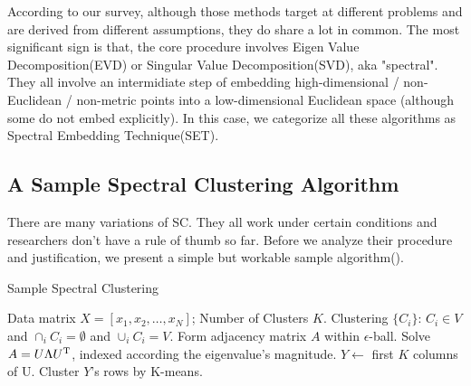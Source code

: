 
According to our survey, although those methods target at different problems
and are derived from different assumptions, they do share a lot in common. 
The most significant sign is that, the core procedure involves 
Eigen Value Decomposition(EVD) or Singular Value Decomposition(SVD), aka "spectral". 
They all involve an intermidiate step of embedding high-dimensional / 
non-Euclidean / non-metric points into a low-dimensional Euclidean space
(although some do not embed explicitly). In this case, we categorize all 
these algorithms as Spectral Embedding Technique(SET). 


\subsection{A Sample Spectral Clustering Algorithm}


There are many variations of SC. They all work under certain conditions
and researchers don't have a rule of thumb so far. Before we analyze their
procedure and justification, we present a simple but workable sample 
algorithm(\ralg{\ref{alg:sc_sample}}). 

\begin{algorithm}[htb]
	\caption{Sample Spectral Clustering}
	\label{alg:sc_sample}
	\begin{algorithmic}[1]
		\REQUIRE Data matrix $X = [x_1, x_2, \ldots, x_N]$;  
		Number of Clusters $K$. 
		\ENSURE Clustering $\{C_i\}$: $C_i \in V$ 
			and $\cap_i C_i = \emptyset$
			and $\cup_i C_i = V$. 
		\STATE Form adjacency matrix $A$ within $\epsilon$-ball.
		\STATE Solve $A = U \Lambda U^\mathrm{T}$, indexed according 
		the eigenvalue's magnitude. 
		\STATE $Y \leftarrow$ first $K$ columns of U. 
		\STATE Cluster $Y$'s rows by K-means. 
	\end{algorithmic}
\end{algorithm}

